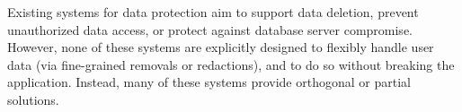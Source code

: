 \let\rwhighlight\relax

\begin{comment}
\begin{figure}[t]
    \centering
    \small
    \begin{tabular}{m{0.23\linewidth}|m{0.19\linewidth}|m{0.19\linewidth}|>{\RaggedRight\arraybackslash}m{0.19\linewidth}} %
        \multirow{2}{*}{\centering\textbf{System}} &
            \multicolumn{3}{c}{\textbf{User $u$'s data is protected against...}}\\
        \cline{2-4}
            & \emph{SQL injection}
            & \emph{Compromised user $\neq u$}
            & \emph{Server compromise} \\
        \hline
        Qapla~\cite{qapla} & \hfil \checkmark & & \\
        \hline
        CryptDB~\cite{cryptdb} & \hfil \checkmark & & \hfil \checkmark \\
    \end{tabular}
    \caption{Threats protected against by different classes of systems.}
    \label{tab:related_threats}
\end{figure}
\end{comment}

%
%
Existing systems for data protection aim to support data deletion, prevent
unauthorized data access, or protect against database server compromise.
%
However, none of these systems are explicitly designed to flexibly handle user
data (via fine-grained removals or redactions), and to do so without breaking
the application. Instead, many of these systems provide orthogonal or partial
solutions.

